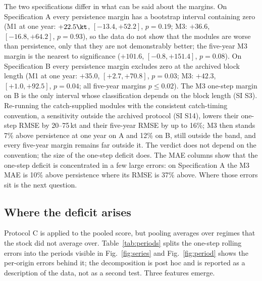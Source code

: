 The two specifications differ in what can be said about the margins. On Specification A every persistence margin has a bootstrap interval containing zero (M1 at one year: $+22.5\kt$, $[-13.4, +52.2]$, $p=0.19$; M3: $+36.6$, $[-16.8, +64.2]$, $p=0.93$), so the data do not show that the modules are worse than persistence, only that they are not demonstrably better; the five-year M3 margin is the nearest to significance ($+101.6$, $[-0.8, +151.4]$, $p=0.08$). On Specification B every persistence margin excludes zero at the archived block length (M1 at one year: $+35.0$, $[+2.7, +70.8]$, $p=0.03$; M3: $+42.3$, $[+1.0, +92.5]$, $p=0.04$; all five-year margins $p\le 0.02$). The M3 one-step margin on B is the only interval whose classification depends on the block length (SI S3). Re-running the catch-supplied modules with the consistent catch-timing convention, a sensitivity outside the archived protocol (SI S14), lowers their one-step RMSE by 20--75\,kt and their five-year RMSE by up to 16\%; M3 then stands 7\% above persistence at one year on A and 12\% on B, still outside the band, and every five-year margin remains far outside it. The verdict does not depend on the convention; the size of the one-step deficit does. The MAE columns show that the one-step deficit is concentrated in a few large errors: on Specification A the M3 MAE is 10\% above persistence where its RMSE is 37\% above. Where those errors sit is the next question.

\FloatBarrier
\subsection{Where the deficit arises}\label{sec:periods}

Protocol C is applied to the pooled score, but pooling averages over regimes that the stock did not average over. Table~\ref{tab:periods} splits the one-step rolling errors into the periods visible in Fig.~\ref{fig:series} and Fig.~\ref{fig:period} shows the per-origin errors behind it; the decomposition is post hoc and is reported as a description of the data, not as a second test. Three features emerge.

